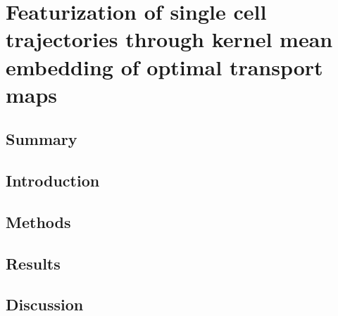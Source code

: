\newcommand*{\tran}{^{\mkern-1.5mu\mathsf{T}}}
\newcommand*{\matr}[1]{\bm{#1}}
\newcommand*{\vect}[1]{\bm{#1}}
\newcommand*{\timepoint}[1]{_{#1}}
\newcommand*{\pullback}{\,\flat\,}
\newcommand*{\pushforward}{\,\sharp\,}
\newcommand\given[1][]{\:#1\vert\:}

\chapter{Featurization of single cell trajectories through kernel mean embedding of optimal transport maps}

\section{Summary}


\section{Introduction}


\section{Methods}


\section{Results}


\section{Discussion}

